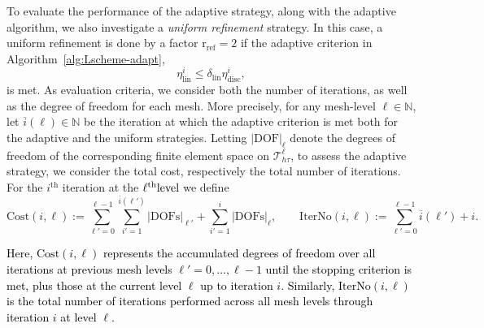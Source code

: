 \documentclass[review,11pt]{article}
\numberwithin{equation}{section}
\def \N  {{\mathbb{N}}}
\def \htt {{h\tau}}
\def \calT {\mathcal{T}}
\begin{document}
To evaluate the performance of the adaptive strategy, along with the adaptive algorithm, we also investigate a \emph{uniform refinement} strategy. In this case, a uniform refinement is done by a factor $\mathrm{r}_\mathrm{ref}=2$ if the adaptive criterion in Algorithm~\ref{alg:Lscheme-adapt},
\[\eta_{\mathrm{lin}}^i\le \delta_{\mathrm{lin}}\eta^i_{\mathrm{disc}},\]
is met. As evaluation criteria, we consider both the number of iterations, as well as the degree of freedom for each mesh. More precisely, for any mesh-level $\ell\in \N$, let $\overline{i}(\ell)\in \N$ be the iteration at which the adaptive criterion is met both for the adaptive and the uniform strategies. Letting $|\mathrm{DOF}|_\ell$ denote the degrees of freedom of the corresponding finite element space on $\calT^\ell_\htt$, to assess the adaptive strategy, we consider the total cost, respectively the total number of iterations. For the $i^{\mathrm{th}}$ iteration at the $\ell^{\rm th} \text{level}$ we define
\begin{equation}
  \label{eq:cost}\mathrm{Cost}(i,\ell)
:= \sum_{\ell'=0}^{\ell-1}\sum_{i'=1}^{\overline{i}(\ell')}|\mathrm{DOFs}|_{\ell'} + \sum_{i'=1}^i |\mathrm{DOFs}|_{\ell},\qquad \mathrm{IterNo}(i,\ell):=\sum_{\ell'=0}^{\ell-1} \overline{i}(\ell') + i.
\end{equation}

\textcolor{black}{Here, $\mathrm{Cost}(i,\ell)$ represents the accumulated degrees of freedom over all iterations at previous mesh levels $\ell'=0,\ldots,\ell-1$ until the stopping criterion is met, plus those at the current level $\ell$ up to iteration $i$. Similarly, $\mathrm{IterNo}(i,\ell)$ is the total number of iterations performed across all mesh levels through iteration $i$ at level $\ell$.}
 
\end{document}
